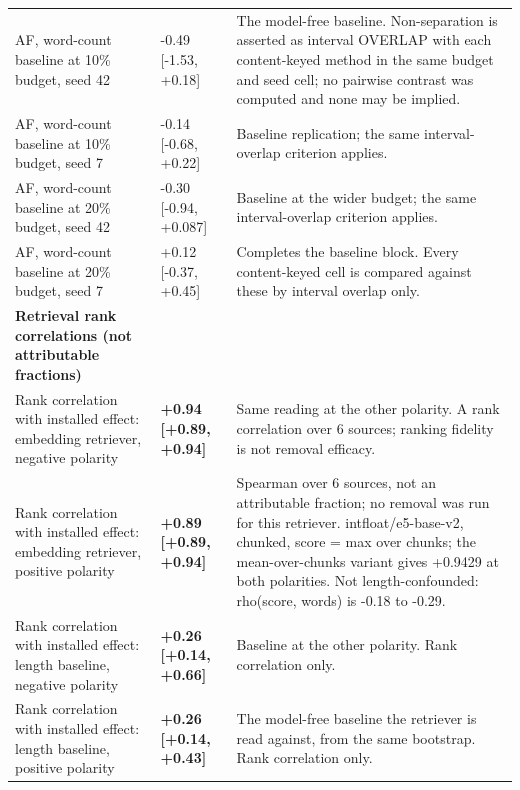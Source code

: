 \documentclass[10pt]{article}
\begin{document}
{\begin{longtable}{ p{4.08cm}lp{7.60cm} }
AF, word-count baseline at 10\% budget, seed 42 & -0.49 [-1.53, +0.18] & The model-free baseline. Non-separation is asserted as interval OVERLAP with each content-keyed method in the same budget and seed cell; no pairwise contrast was computed and none may be implied. \\

AF, word-count baseline at 10\% budget, seed 7 & -0.14 [-0.68, +0.22] & Baseline replication; the same interval-overlap criterion applies. \\

AF, word-count baseline at 20\% budget, seed 42 & -0.30 [-0.94, +0.087] & Baseline at the wider budget; the same interval-overlap criterion applies. \\

AF, word-count baseline at 20\% budget, seed 7 & +0.12 [-0.37, +0.45] & Completes the baseline block. Every content-keyed cell is compared against these by interval overlap only. \\

\textbf{ Retrieval rank correlations (not attributable fractions) } &  &  \\

Rank correlation with installed effect: embedding retriever, negative polarity & \textbf{ +0.94 [+0.89, +0.94] } & Same reading at the other polarity. A rank correlation over 6 sources; ranking fidelity is not removal efficacy. \\

Rank correlation with installed effect: embedding retriever, positive polarity & \textbf{ +0.89 [+0.89, +0.94] } & Spearman over 6 sources, not an attributable fraction; no removal was run for this retriever. intfloat/e5-base-v2, chunked, score = max over chunks; the mean-over-chunks variant gives +0.9429 at both polarities. Not length-confounded: rho(score, words) is -0.18 to -0.29. \\

Rank correlation with installed effect: length baseline, negative polarity & \textbf{ +0.26 [+0.14, +0.66] } & Baseline at the other polarity. Rank correlation only. \\

Rank correlation with installed effect: length baseline, positive polarity & \textbf{ +0.26 [+0.14, +0.43] } & The model-free baseline the retriever is read against, from the same bootstrap. Rank correlation only. \\

\end{longtable}
}
\end{document}
